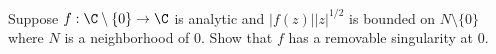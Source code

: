Suppose $f:\C\setminus \{0\}\rightarrow \C$ is analytic and
$|f(z)||z|^{1/2}$ is bounded on $N\setminus \{0\}$ where $N$ is a
neighborhood of $0$. Show that $f$ has a removable singularity at $0$.
